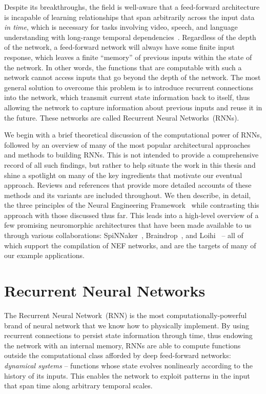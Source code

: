 Despite its breakthroughs, the field is well-aware that a feed-forward architecture is incapable of learning relationships that span arbitrarily across the input data \emph{in time}, which is necessary for tasks involving video, speech, and language understanding with long-range temporal dependencies~\citep{bengio1994learning}.
Regardless of the depth of the network, a feed-forward network will always have some finite input response, which leaves a finite ``memory'' of previous inputs within the state of the network.
In other words, the functions that are computable with such a network cannot access inputs that go beyond the depth of the network.
The most general solution to overcome this problem is to introduce recurrent connections into the network, which transmit current state information back to itself, thus allowing the network to capture information about previous inputs and reuse it in the future. 
These networks are called Recurrent Neural Networks~(RNNs).

We begin with a brief theoretical discussion of the computational power of RNNs, followed by an overview of many of the most popular architectural approaches and methods to building RNNs.
This is not intended to provide a comprehensive record of all such findings, but rather to help situate the work in this thesis and shine a spotlight on many of the key ingredients that motivate our eventual approach.
Reviews and references that provide more detailed accounts of these methods and its variants are included throughout.
We then describe, in detail, the three principles of the Neural Engineering Framework~\citep[NEF;][]{eliasmith2003a} while contrasting this approach with those discussed thus far.
This leads into a high-level overview of a few promising neuromorphic architectures that have been made available to us through various collaborations: SpiNNaker~\citep{furber2014spinnaker}, Braindrop~\citep{braindrop2019}, and Loihi~\citep{davies2018loihi} -- all of which support the compilation of NEF networks, and are the targets of many of our example applications.

\section{Recurrent Neural Networks}

The Recurrent Neural Network~(RNN) is the most computationally-powerful brand of neural network that we know how to physically implement.
By using recurrent connections to persist state information through time, thus endowing the network with an internal memory, RNNs are able to compute functions outside the computational class afforded by deep feed-forward networks: \emph{dynamical systems} -- functions whose state evolves nonlinearly according to the history of its inputs.
This enables the network to exploit patterns in the input that span time along arbitrary temporal scales.

